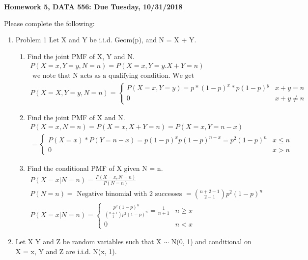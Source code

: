 \documentclass[11pt]{article}
\begin{document}
\begin{title}
	{\Large\bf Homework 5, DATA 556: Due Tuesday, 10/31/2018}
\end{title}

\author{\bf Alexander Van Roijen}

\maketitle

\newpage
Please complete the following:
\begin{enumerate}
\item Problem 1
Let X and Y be i.i.d. Geom(p), and N = X + Y.
\begin{enumerate}
	\item Find the joint PMF of X, Y and N.
	\begin{gather}
		P(X=x,Y=y,N=n) = P(X=x,Y=y.X+Y=n) \\
		 \text{ we note that N acts as a qualifying condition. We get } \\
		P(X=X,Y=y,N=n) = \begin{cases}
		P(X=x,Y=y)=p*(1-p)^x*p(1-p)^y & x+y=n\\
		0 & x+y \ne n
		\end{cases}
	\end{gather}
	\item Find the joint PMF of X and N.
	\begin{gather}
		P(X=x,N=n) = P(X=x,X+Y=n)=P(X=x,Y=n-x)\\
		= \begin{cases}
			P(X=x)*P(Y=n-x) =p(1-p)^xp(1-p)^{n-x}=p^2(1-p)^n &x\le n\\
			0 & x>n
		  \end{cases}
	\end{gather}
	\item Find the conditional PMF of X given N = n.
	\begin{gather}
		P(X=x|N=n)=\frac{P(X=x,N=n)}{P(N=n)}\\
		P(N=n) = \text{ Negative binomial with 2 successes } = \binom{n+2-1}{2-1}p^2(1-p)^n \\
		P(X=x|N=n) = \begin{cases}
		\frac{p^2(1-p)^n}{\binom{n+1}{1}p^2(1-p)^n}  = \frac{1}{n+1}& n\ge x \\
		0 & n < x
		\end{cases}
	\end{gather}
\end{enumerate}
\item Let X Y and Z be random variables such that X $\sim$ N(0, 1) and conditional on X = x, Y and Z are i.i.d. N(x, 1).

\end{enumerate}
\end{document}
